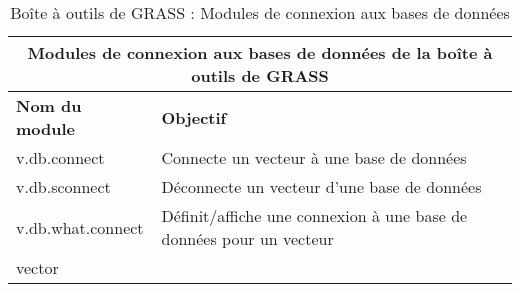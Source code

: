 \begin{table}[H]
\centering
 \begin{tabular}{|p{4cm}|p{10cm}|}
  \hline \multicolumn{2}{|c|}{\textbf{Modules de connexion aux bases de données de la boîte à outils de GRASS}} \\
  \hline \textbf{Nom du module} & \textbf{Objectif} \\
  \hline v.db.connect & Connecte un vecteur à une base de données\\
  \hline v.db.sconnect & Déconnecte un vecteur d'une base de données\\
  \hline v.db.what.connect & Définit/affiche une connexion à une base de données pour un vecteur\\ vector \\
\hline
\end{tabular}
\caption{Boîte à outils de GRASS : Modules de connexion aux bases de données}
\end{table}

